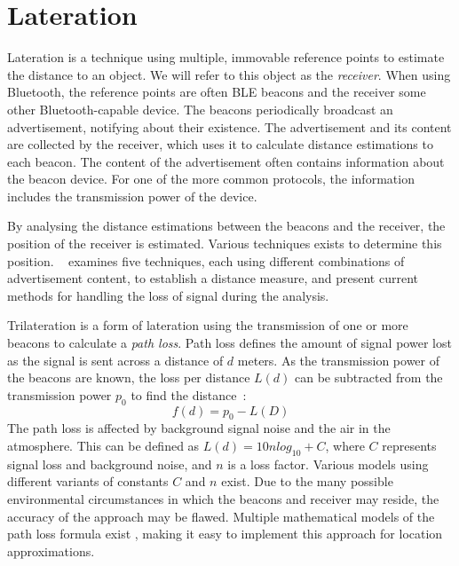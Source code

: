 \section{Lateration}
Lateration is a technique using multiple, immovable reference points to estimate the distance to an object\cite{presence_ble_review}.
We will refer to this object as the \textit{receiver}.
When using Bluetooth, the reference points are often BLE beacons and the receiver some other Bluetooth-capable device. 
The beacons periodically broadcast an advertisement, notifying about their existence.\cite{apple2023ibeacon} 
The advertisement and its content are collected by the receiver, which uses it to calculate distance estimations to each beacon. 
The content of the advertisement often contains information about the beacon device. 
For one of the more common protocols, the information includes the transmission power of the device\cite{apple2023ibeacon}.

By analysing the distance estimations between the beacons and the receiver, the position of the receiver is estimated.
Various techniques exists to determine this position.
\citeauthor{presence_ble_review}~\cite{presence_ble_review} examines five techniques, each using different combinations of advertisement content, to establish a distance measure, and present current methods for handling the loss of signal during the analysis.

Trilateration is a form of lateration using the transmission of one or more beacons to calculate a \textit{path loss}.
Path loss defines the amount of signal power lost as the signal is sent across a distance of $d$ meters.
As the transmission power of the beacons are known, the loss per distance $L(d)$ can be subtracted from the transmission power $p_0$ to find the distance~\cite{taking_localization_to_the_wild}:
\begin{equation}
    f(d) = p_0 - L(D)
\end{equation}
The path loss is affected by background signal noise and the air in the atmosphere.
This can be defined as $L(d) = 10n log_{10}+C$, where $C$ represents signal loss and background noise, and $n$ is a loss factor. \cite{presence_ble_review}
Various models using different variants of constants $C$ and $n$ exist\cite{path_loss_models}.
Due to the many possible environmental circumstances in which the beacons and receiver may reside, the accuracy of the approach may be flawed\cite{presence_ble_review}. 
Multiple mathematical models of the path loss formula exist \cite{rssi_indoor_pos,positioning_alg_rssi, RSSI_ZigBee_distance}, making it easy to implement this approach for location approximations.